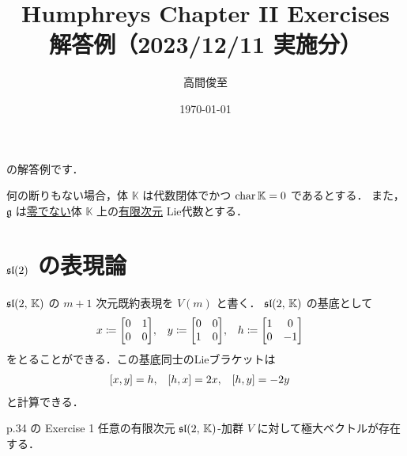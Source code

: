 \documentclass{ltjsarticle}
\makeatletter
\theoremstyle{mystyle} %
\renewcommand{\proofname}{証明}
\renewenvironment{proof}[1][\proofname]{\par
    \pushQED{\qed}%
    \normalfont \topsep6\p@\@plus6\p@\relax
    \trivlist
    \item[\hskip\labelsep
        \itshape
    \textbf{\underline{#1}}]\ignorespaces
}{%
    \popQED\endtrivlist\@endpefalse
}
\numberwithin{equation}{section}
\newcommand{\lto}{\longrightarrow}
\newcommand{\btr}{\blacktriangleright}
\makeatother
\begin{document}
\title{Humphreys Chapter II Exercises \\ 解答例（2023/12/11 実施分）}
\author{高間俊至}
\date{\today}
\maketitle

\setcounter{section}{1}

\cite[p.30, Exercise1]{Humphreys1972introduction}
の解答例です．

何の断りもない場合，体 $\mathbb{K}$ は代数閉体でかつ $\operatorname{char} \mathbb{K} = 0$ であるとする．
また，$\mathfrak{g}$ は\underline{零でない}体 $\mathbb{K}$ 上の\underline{有限次元} Lie代数とする．

\section{$\mathfrak{sl}(2)$ の表現論}

$\mathfrak{sl}(2,\, \mathbb{K})$ の $m+1$ 次元既約表現を $V(m)$ と書く．
$\mathfrak{sl}(2,\, \mathbb{K})$ の基底として
\begin{align}
    x &\coloneqq \mqty[0 & 1 \\ 0&0], & y &\coloneqq \mqty[0&0 \\ 1 &0], & h &\coloneqq \mqty[1 & 0 \\ 0 & -1]
\end{align}
をとることができる．この基底同士のLieブラケットは
\begin{align}
    \label{eq:comm-sl2}
    \comm{x}{y} &= h, & \comm{h}{x} &= 2x, & \comm{h}{y} &= -2y
\end{align}
と計算できる．

\begin{myproblem}[label=ex:2-7-1]{p.34 の Exercise 1}
    任意の有限次元 $\mathfrak{sl}(2,\, \mathbb{K})$-加群 $V$ に対して極大ベクトルが存在する．
\end{myproblem}

\end{document}
